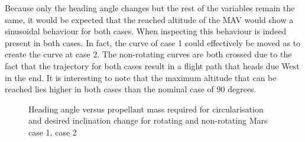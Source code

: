 \noindent
Because only the heading angle changes but the rest of the variables remain the same, it would be expected that the reached altitude of the \ac{MAV} would show a sinusoidal behaviour for both cases. When inspecting  this behaviour is indeed present in both cases. In fact, the curve of case 1 could effectively be moved as to create the curve at case 2. The non-rotating curves are both crossed due to the fact that the trajectory for both cases result in a flight path that heads due West in the end. It is interesting to note that the maximum altitude that can be reached lies higher in both cases than the nominal case of 90 degrees. 


\begin{figure}[H]
\centering
{} 
\caption{Heading angle versus propellant mass required for circularisation and desired inclination change for rotating and non-rotating Mars \protect{} case 1,  \protect{} case 2 } 
\label{fig:headingAnglevsPropellantMassCase1combined} 
\end{figure}

